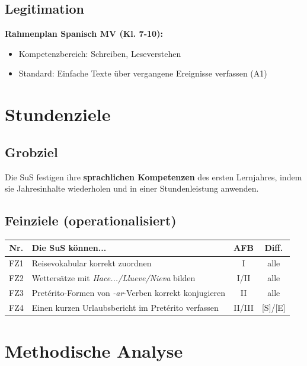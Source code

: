 \documentclass[11pt,a4paper]{article}
\begin{document}
\subsection{Legitimation}
\textbf{Rahmenplan Spanisch MV (Kl. 7-10):}
\begin{itemize}
    \item Kompetenzbereich: Schreiben, Leseverstehen
    \item Standard: Einfache Texte über vergangene Ereignisse verfassen (A1)
\end{itemize}

\section{Stundenziele}

\subsection{Grobziel}
Die SuS festigen ihre \textbf{sprachlichen Kompetenzen} des ersten Lernjahres, indem sie Jahresinhalte wiederholen und in einer Stundenleistung anwenden.

\subsection{Feinziele (operationalisiert)}
\begin{tabular}{|c|p{8cm}|c|c|}
\hline
\textbf{Nr.} & \textbf{Die SuS können...} & \textbf{AFB} & \textbf{Diff.} \\
\hline
FZ1 & Reisevokabular korrekt zuordnen & I & alle \\
\hline
FZ2 & Wettersätze mit \textit{Hace.../Llueve/Nieva} bilden & I/II & alle \\
\hline
FZ3 & Pretérito-Formen von \textit{-ar}-Verben korrekt konjugieren & II & alle \\
\hline
FZ4 & Einen kurzen Urlaubsbericht im Pretérito verfassen & II/III & [S]/[E] \\
\hline
\end{tabular}

\section{Methodische Analyse}
\end{document}
